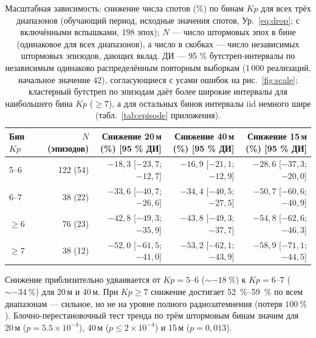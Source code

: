 \documentclass{agujournal2019}
\begin{document}
\begin{table}[h]
	\centering
	\footnotesize
	\setlength{\tabcolsep}{3pt}
	\caption{Масштабная зависимость: снижение числа спотов (\%) по бинам
		$Kp$ для всех трёх диапазонов (обучающий период, исходные значения
		спотов, Ур.~\eqref{eq:drop}; с включёнными вспышками, 198 эпох); $N$ — число штормовых эпох
		в бине (одинаковое для всех диапазонов), а число в скобках — число независимых
		штормовых эпизодов, дающих вклад. ДИ — 95 \% бутстреп-интервалы по независимым одинаково распределённым повторным выборкам
		(1\,000 реализаций, начальное значение 42), согласующиеся с усами ошибок на
		рис.~\ref{fig:scale}; кластерный бутстреп по эпизодам даёт более
		широкие интервалы для наибольшего бина $Kp$ ($\ge 7$), а для
		остальных бинов интервалы iid немного шире (табл.~\ref{tab:episode} приложения).}
	\label{tab:scale}
	\begin{tabular}{lrrrr}
		\toprule
		Бин $Kp$ & $N$ (эпизодов)
		& \shortstack[b]{Снижение 20\,м\\ (\%) [95 \% ДИ]}
		& \shortstack[b]{Снижение 40\,м\\ (\%) [95 \% ДИ]}
		& \shortstack[b]{Снижение 15\,м\\ (\%) [95 \% ДИ]} \\
		\midrule
		5--6     & 122 (54)
		& $-18{,}3$ [$-23{,}7$; $-12{,}7$]
		& $-16{,}9$ [$-21{,}1$; $-12{,}9$]
		& $-28{,}6$ [$-37{,}3$; $-20{,}0$] \\
		6--7     & 38 (22)
		& $-33{,}6$ [$-40{,}7$; $-26{,}6$]
		& $-34{,}4$ [$-40{,}5$; $-27{,}5$]
		& $-50{,}7$ [$-60{,}6$; $-40{,}9$] \\
		$\ge 6$  & 76 (23)
		& $-42{,}8$ [$-49{,}3$; $-35{,}9$]
		& $-43{,}8$ [$-49{,}3$; $-37{,}7$]
		& $-54{,}8$ [$-62{,}6$; $-46{,}3$] \\
		$\ge 7$  & 38 (12)
		& $-52{,}0$ [$-61{,}5$; $-41{,}0$]
		& $-53{,}2$ [$-62{,}1$; $-43{,}9$]
		& $-58{,}9$ [$-71{,}1$; $-44{,}5$] \\
		\bottomrule
	\end{tabular}
\end{table}

Снижение приблизительно удваивается от $Kp = 5\text{--}6$
($\sim\SI{-18}{\percent}$) к $Kp = 6\text{--}7$ ($\sim\SI{-34}{\percent}$)
для 20\,м и 40\,м. При $Kp \ge 7$ снижение достигает
\SIrange{52}{59}{\percent} по всем диапазонам — сильное, но не на уровне
полного радиозатемнения (потеря $\SI{100}{\percent}$). Блочно-перестановочный
тест тренда по трём штормовым бинам значим для 20\,м ($p = 5.5\times10^{-4}$),
40\,м ($p \le 2\times10^{-4}$) и 15\,м ($p = 0{,}013$).
\end{document}
